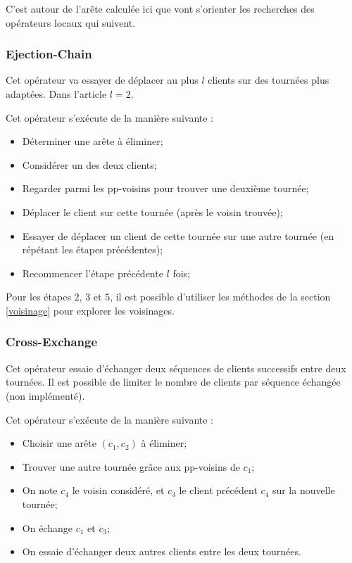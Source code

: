 \documentclass[a4paper,11pt]{article}%
\begin{document}
C'est autour de l'arête calculée ici que vont s'orienter les recherches des opérateurs locaux qui suivent.
 
\subsubsection{Ejection-Chain}

Cet opérateur va essayer de déplacer au plus $l$ clients sur des tournées plus adaptées. Dans l'article $l = 2$.

Cet opérateur s'exécute de la manière suivante :
\begin{itemize}
\item Déterminer une arête à éliminer; 
\item Considérer un des deux clients;
\item Regarder parmi les pp-voisins pour trouver une deuxième tournée;
\item Déplacer le client sur cette tournée (après le voisin trouvée);
\item Essayer de déplacer un client de cette tournée sur une autre tournée (en répétant les étapes précédentes);
\item Recommencer l'étape précédente $l$ fois; \\
\end{itemize} 

Pour les étapes $2$, $3$ et $5$, il est possible d'utiliser les méthodes de la section \ref{voisinage} pour explorer les voisinages.

\subsubsection{Cross-Exchange}

Cet opérateur essaie d'échanger deux séquences de clients successifs entre deux tournées. Il est possible de limiter le nombre de clients par séquence échangée (non implémenté). 

Cet opérateur s'exécute de la manière suivante :
\begin{itemize}
\item Choisir une arête $(c_1,c_2)$ à éliminer;
\item Trouver une autre tournée grâce aux pp-voisins de $c_1$; 
\item On note $c_4$ le voisin considéré, et $c_3$ le client précédent $c_4$ sur la nouvelle tournée;
\item On échange $c_1$ et $c_3$;
\item On essaie d'échanger deux autres clients entre les deux tournées. \\
\end{itemize}
\end{document}
